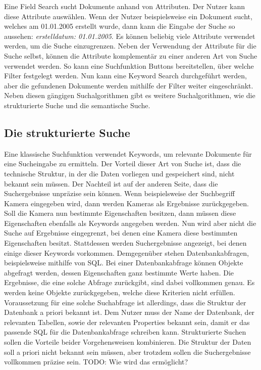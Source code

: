Eine Field Search sucht Dokumente anhand von Attributen.
Der Nutzer kann diese Attribute auswählen.
Wenn der Nutzer beispielsweise ein Dokument sucht, welches am 01.01.2005 erstellt wurde, dann kann die Eingabe der Suche so aussehen: \textit{erstelldatum: 01.01.2005}.
Es können beliebig viele Attribute verwendet werden, um die Suche einzugrenzen.
Neben der Verwendung der Attribute für die Suche selbst, können die Attribute komplementär zu einer anderen Art von Suche verwendet werden.
So kann eine Suchfunktion Buttons bereitstellen, über welche Filter festgelegt werden.
Nun kann eine Keyword Search durchgeführt werden, aber die gefundenen Dokumente werden mithilfe der Filter weiter eingeschränkt.
Neben diesen gängigen Suchalgorithmen gibt es weitere Suchalgorithmen, wie die strukturierte Suche und die semantische Suche.

\subsection{Die strukturierte Suche}
Eine klassische Suchfunktion verwendet Keywords, um relevante Dokumente für eine Sucheingabe zu ermitteln.
Der Vorteil dieser Art von Suche ist, dass die technische Struktur, in der die Daten vorliegen und gespeichert sind, nicht bekannt sein müssen.
Der Nachteil ist auf der anderen Seite, dass die Suchergebnisse unpräzise sein können.
Wenn beispielsweise der Suchbegriff Kamera eingegeben wird, dann werden Kameras als Ergebnisse zurückgegeben.
Soll die Kamera nun bestimmte Eigenschaften besitzen, dann müssen diese Eigenschaften ebenfalls als Keywords angegeben werden.
Nun wird aber nicht die Suche auf Ergebnisse eingegrenzt, bei denen eine Kamera diese bestimmten Eigenschaften besitzt.
Stattdessen werden Suchergebnisse angezeigt, bei denen einige dieser Keywords vorkommen.
Demgegenüber stehen Datenbankabfragen, beispielsweise mithilfe von SQL.
Bei einer Datenbankabfrage können Objekte abgefragt werden, dessen Eigenschaften ganz bestimmte Werte haben.
Die Ergebnisse, die eine solche Abfrage zurückgibt, sind dabei vollkommen genau.
Es werden keine Objekte zurückgegeben, welche diese Kriterien nicht erfüllen.
Voraussetzung für eine solche Suchabfrage ist allerdings, dass die Struktur der Datenbank a priori bekannt ist.
Dem Nutzer muss der Name der Datenbank, der relevanten Tabellen, sowie der relevanten Properties bekannt sein, damit er das passende SQL für die Datenbankabfrage schreiben kann.
Strukturierte Suchen sollen die Vorteile beider Vorgehensweisen kombinieren.
Die Struktur der Daten soll a priori nicht bekannt sein müssen, aber trotzdem sollen die Suchergebnisse vollkommen präzise sein.
TODO: Wie wird das ermöglicht?

